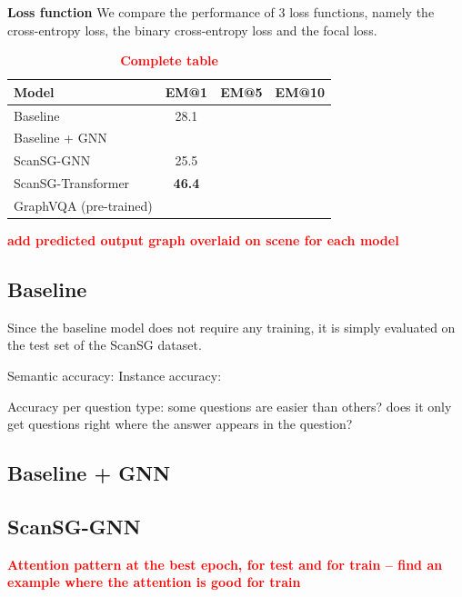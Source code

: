 \bigskip
\noindent \textbf{Loss function}
We compare the performance of 3 loss functions, namely the cross-entropy loss, the binary cross-entropy loss and the focal loss.

\begin{table}[h!]
    \centering
    \caption{\textcolor{red}{\textbf{Complete table}}}
    \begin{tabular}{|l|c|l|l|}
    \hline
    \textbf{Model}         & \textbf{EM@1} & \textbf{EM@5} & \textbf{EM@10} \\ \hline
    Baseline               & 28.1                   &               &                \\ \hline
    Baseline + GNN         & \multicolumn{1}{l|}{}  &               &                \\ \hline
    ScanSG-GNN             & 25.5                   &               &                \\ \hline
    ScanSG-Transformer     & \textbf{46.4}          &               &                \\ \hline
    GraphVQA (pre-trained) & \multicolumn{1}{l|}{}  &               &                \\ \hline
    \end{tabular}
\end{table}

\textcolor{red}{\textbf{add predicted output graph overlaid on scene for each model}}


\subsection{Baseline}
Since the baseline model does not require any training, it is simply evaluated on the test set of the ScanSG dataset.

Semantic accuracy:
Instance accuracy:

Accuracy per question type:
some questions are easier than others?
does it only get questions right where the answer appears in the question?

\subsection{Baseline + GNN}


\subsection{ScanSG-GNN}
\textcolor{red}{\textbf{Attention pattern at the best epoch, for test and for train -- find an example where the attention is good for train}}


